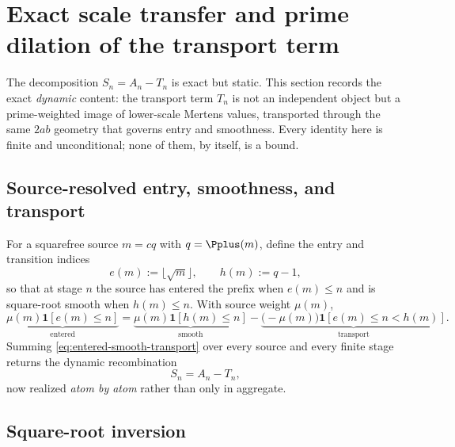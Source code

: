 \section{Exact scale transfer and prime dilation of the transport term}
\label{sec:scale-transfer}

The decomposition $S_n=A_n-T_n$ is exact but static.  This section records the exact \emph{dynamic} content: the transport term $T_n$ is not an independent object but a prime-weighted image of lower-scale Mertens values, transported through the same $2ab$ geometry that governs entry and smoothness.  Every identity here is finite and unconditional; none of them, by itself, is a bound.

\subsection{Source-resolved entry, smoothness, and transport}

For a squarefree source $m=cq$ with $q=\Pplus(m)$, define the entry and transition indices
\begin{equation}
 e(m):=\lfloor\sqrt m\rfloor,
 \qquad
 h(m):=q-1,
 \label{eq:entry-transition-indices}
\end{equation}
so that at stage $n$ the source has entered the prefix when $e(m)\le n$ and is square-root smooth when $h(m)\le n$.  With source weight $\mu(m)$,
\begin{equation}
 \underbrace{\mu(m)\mathbf 1[e(m)\le n]}_{\text{entered}}
 =\underbrace{\mu(m)\mathbf 1[h(m)\le n]}_{\text{smooth}}
 -\underbrace{\bigl(-\mu(m)\bigr)\mathbf 1[e(m)\le n<h(m)]}_{\text{transport}} .
 \label{eq:entered-smooth-transport}
\end{equation}
Summing \cref{eq:entered-smooth-transport} over every source and every finite stage returns the dynamic recombination
\begin{equation}
 S_n=A_n-T_n,
 \label{eq:dynamic-recombination}
\end{equation}
now realized \emph{atom by atom} rather than only in aggregate.

\subsection{Square-root inversion}

